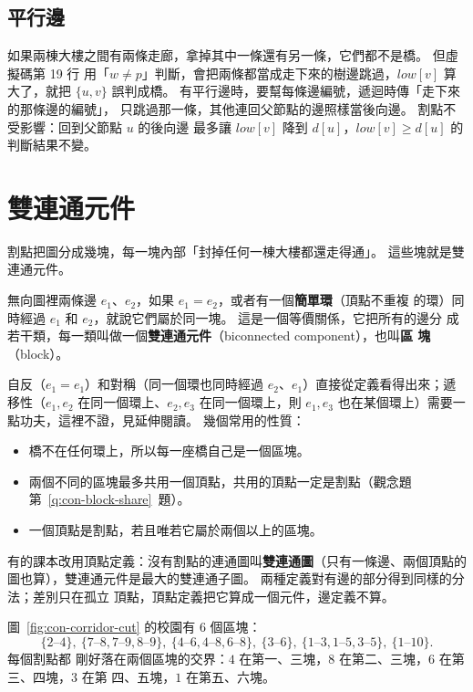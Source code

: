 \subsection{平行邊}

如果兩棟大樓之間有兩條走廊，拿掉其中一條還有另一條，它們都不是橋。 但虛擬碼第 19 行
用「$w \ne p$」判斷，會把兩條都當成走下來的樹邊跳過，$\mathit{low}[v]$ 算大了，就把
$\{u, v\}$ 誤判成橋。 有平行邊時，要幫每條邊編號，遞迴時傳「走下來的那條邊的編號」，
只跳過那一條，其他連回父節點的邊照樣當後向邊。 割點不受影響：回到父節點 $u$ 的後向邊
最多讓 $\mathit{low}[v]$ 降到 $d[u]$，$\mathit{low}[v] \ge d[u]$ 的判斷結果不變。

\section{雙連通元件}
\label{sec:con-bcc}

割點把圖分成幾塊，每一塊內部「封掉任何一棟大樓都還走得通」。 這些塊就是雙連通元件。

\begin{definition}
無向圖裡兩條邊 $e_1$、$e_2$，如果 $e_1 = e_2$，或者有一個\textbf{簡單環}（頂點不重複
的環）同時經過 $e_1$ 和 $e_2$，就說它們屬於同一塊。 這是一個等價關係，它把所有的邊分
成若干類，每一類叫做一個\textbf{雙連通元件}（biconnected component），也叫\textbf{區
塊}（block）。
\end{definition}

自反（$e_1 = e_1$）和對稱（同一個環也同時經過 $e_2$、$e_1$）直接從定義看得出來；遞移性（$e_1, e_2$ 在同一個環上、$e_2, e_3$ 在同一個環上，則
$e_1, e_3$ 也在某個環上）需要一點功夫，這裡不證，見延伸閱讀。 幾個常用的性質：

\begin{itemize}
\item 橋不在任何環上，所以每一座橋自己是一個區塊。
\item 兩個不同的區塊最多共用一個頂點，共用的頂點一定是割點（觀念題第~\ref{q:con-block-share}~題）。
\item 一個頂點是割點，若且唯若它屬於兩個以上的區塊。
\end{itemize}

有的課本改用頂點定義：沒有割點的連通圖叫\textbf{雙連通圖}（只有一條邊、兩個頂點的
圖也算），雙連通元件是最大的雙連通子圖。 兩種定義對有邊的部分得到同樣的分法；差別只在孤立
頂點，頂點定義把它算成一個元件，邊定義不算。

圖~\ref{fig:con-corridor-cut} 的校園有 $6$ 個區塊：
\[
\{2\text{--}4\},\ \{7\text{--}8, 7\text{--}9, 8\text{--}9\},\ \{4\text{--}6, 4\text{--}8, 6\text{--}8\},\
\{3\text{--}6\},\ \{1\text{--}3, 1\text{--}5, 3\text{--}5\},\ \{1\text{--}10\}.
\]
每個割點都
剛好落在兩個區塊的交界：$4$ 在第一、三塊，$8$ 在第二、三塊，$6$ 在第三、四塊，$3$ 在第
四、五塊，$1$ 在第五、六塊。

